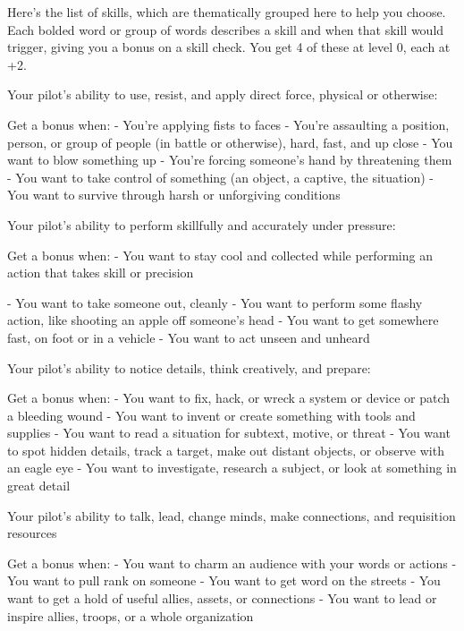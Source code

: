 Here’s the list of skills, which are thematically grouped here to help you choose. Each bolded  
word or group of words describes a skill and when that skill would trigger, giving you a bonus on a  
skill check. You get 4 of these at level 0, each at +2.  

Your pilot’s ability to use, resist, and apply direct force, physical or otherwise:  

Get a bonus when:  
          - You’re applying fists to faces  
          - You’re assaulting a position, person, or group of people (in battle or otherwise), hard,  
         fast, and up close  
          - You want to blow something up  
          - You’re forcing someone’s hand by threatening them  
          - You want to take control of something (an object, a captive, the situation)  
          - You want to survive through harsh or unforgiving conditions  

Your pilot’s ability to perform skillfully and accurately under pressure:  

Get a bonus when:  
         - You want to stay cool and collected while performing an action that takes skill or                          
         precision  

                                                                                                                      


         - You want to take someone out, cleanly  
         - You want to perform some flashy action, like shooting an apple off someone’s head  
         - You want to get somewhere fast, on foot or in a vehicle  
         - You want to act unseen and unheard  

Your pilot’s ability to notice details, think creatively, and prepare:  

Get a bonus when:  
         - You want to fix, hack, or wreck a system or device or patch a bleeding wound  
         - You want to invent or create something with tools and supplies  
         - You want to read a situation for subtext, motive, or threat  
         - You want to spot hidden details, track a target, make out distant objects, or observe with   
         an eagle eye  
         - You want to investigate, research a subject, or look at something in great detail  

Your pilot’s ability to talk, lead, change minds, make connections, and requisition  
resources  

Get a bonus when:  
         - You want to charm an audience with your words or actions  
         - You want to pull rank on someone  
         - You want to get word on the streets  
         - You want to get a hold of useful allies, assets, or connections  
         - You want to lead or inspire allies, troops, or a whole organization  

